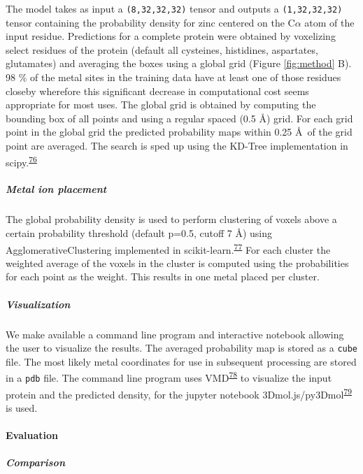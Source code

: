 \documentclass[ lineno,
  9pt]{elife}
\begin{document}
The model takes as input a \texttt{(8,32,32,32)} tensor and outputs a \texttt{(1,32,32,32)} tensor containing the probability density for zinc centered on the C$\alpha$ atom of the input residue.
Predictions for a complete protein were obtained by voxelizing select residues of the protein (default all cysteines, histidines, aspartates, glutamates) and averaging the boxes using a global grid (Figure \ref{fig:method} B). 98 \% of the metal sites in the training data have at least one of those residues closeby wherefore this significant decrease in computational cost seems appropriate for most uses. The global grid is obtained by computing the bounding box of all points and using a regular spaced (0.5 \AA ) grid. For each grid point in the global grid the predicted probability maps within 0.25 \AA\, of the grid point are averaged. The search is sped up using the KD-Tree implementation in scipy.\textsuperscript{\protect\hyperlink{ref-8Miti2Gz}{76}}

\hypertarget{metal-ion-placement}{%
\subparagraph{Metal ion placement}\label{metal-ion-placement}}

The global probability density is used to perform clustering of voxels above a certain probability threshold (default p=0.5, cutoff 7 \AA ) using AgglomerativeClustering implemented in scikit-learn.\textsuperscript{\protect\hyperlink{ref-AujvwLp6}{77}} For each cluster the weighted average of the voxels in the cluster is computed using the probabilities for each point as the weight. This results in one metal placed per cluster.

\hypertarget{visualization}{%
\subparagraph{Visualization}\label{visualization}}

We make available a command line program and interactive notebook allowing the user to visualize the results. The averaged probability map is stored as a \texttt{cube} file. The most likely metal coordinates for use in subsequent processing are stored in a \texttt{pdb} file. The command line program uses VMD\textsuperscript{\protect\hyperlink{ref-PEXAwV3k}{78}} to visualize the input protein and the predicted density, for the jupyter notebook 3Dmol.js/py3Dmol\textsuperscript{\protect\hyperlink{ref-BguJBlg6}{79}} is used.

\hypertarget{evaluation}{%
\paragraph{Evaluation}\label{evaluation}}

\hypertarget{comparison}{%
\subparagraph{Comparison}\label{comparison}}
\end{document}
